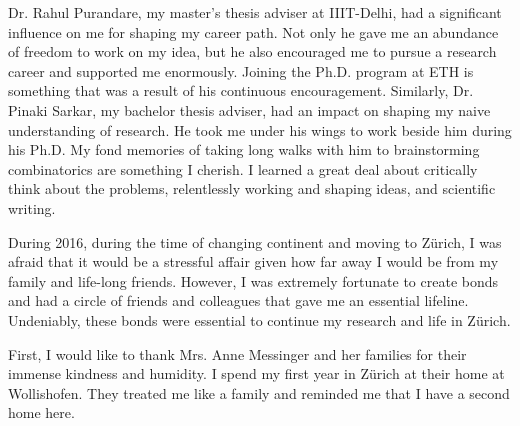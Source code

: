 Dr. Rahul Purandare, my master's thesis adviser at IIIT-Delhi, had a significant influence on me for shaping my career path. Not only he gave me an abundance of freedom to work on my idea, but he also encouraged me to pursue a research career and supported me enormously. Joining the Ph.D. program at ETH is something that was a result of his continuous encouragement. Similarly, Dr. Pinaki Sarkar, my bachelor thesis adviser, had an impact on shaping my naive understanding of research. He took me under his wings to work beside him during his Ph.D. My fond memories of taking long walks with him to brainstorming combinatorics are something I cherish. I learned a great deal about critically think about the problems, relentlessly working and shaping ideas, and scientific writing.


During 2016, during the time of changing continent and moving to Z\"urich, I was afraid that it would be a stressful affair given how far away I would be from my family and life-long friends. However, I was extremely fortunate to create bonds and had a circle of friends and colleagues that gave me an essential lifeline. Undeniably, these bonds were essential to continue my research and life in Z\"urich. 


First, I would like to thank Mrs. Anne Messinger and her families for their immense kindness and humidity. I spend my first year in Z\"urich at their home at Wollishofen. They treated me like a family and reminded me that I have a second home here. 


